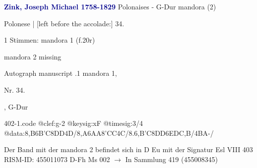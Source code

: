 \documentclass[twocolumn]{book}
\begin{document}
\newline \par \vspace{7pt} \textcolor{darkblue}{\textbf{Zink, Joseph Michael  1758-1829}}
\newline Polonaises - G-Dur
\newline mandora (2)
\newline \begin{itshape}[f.20r, at left:] Polonese | [left before the accolade:] 34.\end{itshape} 
\newline \textcolor{darkblue}{}  1 Stimmen: mandora 1  (f.20r)
\newline \begin{small} mandora 2 missing\end{small} 
\newline Autograph manuscript
.1  mandora 1, \begin{itshape}Nr. 34.\end{itshape}, G-Dur  
\begin{filecontents*}{402-1.code}
@clef:g-2
@keysig:xF
@timesig:3/4
@data:{8,B6B'C}8DD4D/{8,A6AA}{8'CC}4C/{8.6,B'C}8DD6EDC,B/4BA-/
\end{filecontents*}
\newline
%
\newline Der Band mit der mandora 2 befindet sich in D Eu mit der Signatur Esl VIII 403
\newline RISM-ID: 455011073
\newline D-Fh  Ms 002
\newline $\rightarrow$ In Sammlung 419 (455008345)
      
\end{document}
